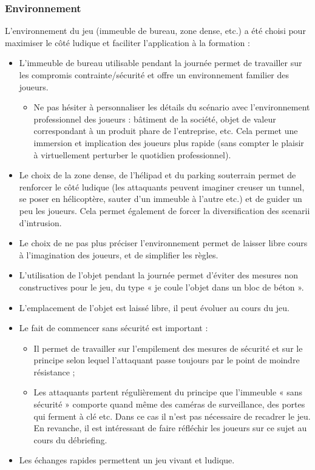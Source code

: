 \documentclass[11pt]{article} %
\begin{document}
\subsubsection{Environnement}
L'environnement du jeu (immeuble de bureau, zone dense, etc.) a été choisi pour
maximiser le côté ludique et faciliter l'application à la formation :
\begin{itemize}
\item L'immeuble de bureau utilisable pendant la journée permet de travailler
sur les compromis contrainte/sécurité et offre un environnement familier des
joueurs.
	\begin{itemize}	
\item Ne pas hésiter à personnaliser les détails du scénario avec
l'environnement professionnel des joueurs : bâtiment de la société, objet de
valeur correspondant à un produit phare de l'entreprise, etc. Cela permet une
immersion et implication des joueurs plus rapide (sans compter le plaisir à
virtuellement perturber le quotidien professionnel).
	\end{itemize}
\item Le choix de la zone dense, de l'hélipad et du parking souterrain permet de
renforcer le côté ludique (les attaquants peuvent imaginer creuser un tunnel, se
poser en hélicoptère, sauter d'un immeuble à l'autre etc.) et de guider un peu
les joueurs. Cela permet également de forcer la diversification des scenarii
d'intrusion.
\item Le choix de ne pas plus préciser l'environnement permet de laisser libre
cours à l'imagination des joueurs, et de simplifier les règles.
\item L'utilisation de l'objet pendant la journée permet d'éviter des mesures
non constructives pour le jeu, du type « je coule l'objet dans un bloc de béton
».
\item L'emplacement de l'objet est laissé libre, il peut évoluer au cours du
jeu.
\item	Le fait de commencer sans sécurité est important : 
	\begin{itemize}	
\item Il permet de travailler sur l'empilement des mesures de sécurité et sur le
principe selon lequel l'attaquant passe toujours par le point de moindre
résistance ;
\item Les attaquants partent régulièrement du principe que l'immeuble « sans
sécurité » comporte quand même des caméras de surveillance, des portes qui
ferment à clé etc. Dans ce cas il n'est pas nécessaire de recadrer le jeu. En
revanche, il est intéressant de faire réfléchir les joueurs sur ce sujet au
cours du débriefing.
	\end{itemize}
\item	Les échanges rapides permettent un jeu vivant et ludique.
\end{itemize}
\end{document}

